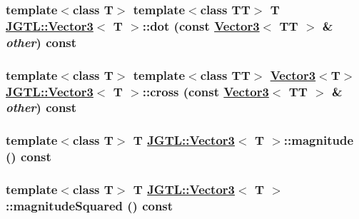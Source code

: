 \hypertarget{class_j_g_t_l_1_1_vector3_36b583fceb4142714a498d16667d9442}{
\subsubsection[dot]{\setlength{\rightskip}{0pt plus 5cm}template$<$class T$>$ template$<$class TT$>$ T \hyperlink{class_j_g_t_l_1_1_vector3}{JGTL::Vector3}$<$ T $>$::dot (const \hyperlink{class_j_g_t_l_1_1_vector3}{Vector3}$<$ TT $>$ \& {\em other}) const}}
\label{class_j_g_t_l_1_1_vector3_36b583fceb4142714a498d16667d9442}


\hypertarget{class_j_g_t_l_1_1_vector3_b2df31c04e7fb4fad13154e2c9034755}{
\subsubsection[cross]{\setlength{\rightskip}{0pt plus 5cm}template$<$class T$>$ template$<$class TT$>$ \hyperlink{class_j_g_t_l_1_1_vector3}{Vector3}$<$T$>$ \hyperlink{class_j_g_t_l_1_1_vector3}{JGTL::Vector3}$<$ T $>$::cross (const \hyperlink{class_j_g_t_l_1_1_vector3}{Vector3}$<$ TT $>$ \& {\em other}) const}}
\label{class_j_g_t_l_1_1_vector3_b2df31c04e7fb4fad13154e2c9034755}


\hypertarget{class_j_g_t_l_1_1_vector3_76b6c8216c59e895f9e1360cb0deea67}{
\subsubsection[magnitude]{\setlength{\rightskip}{0pt plus 5cm}template$<$class T$>$ T \hyperlink{class_j_g_t_l_1_1_vector3}{JGTL::Vector3}$<$ T $>$::magnitude () const}}
\label{class_j_g_t_l_1_1_vector3_76b6c8216c59e895f9e1360cb0deea67}


\hypertarget{class_j_g_t_l_1_1_vector3_642599e9f0c714fa746cf583fff34297}{
\subsubsection[magnitudeSquared]{\setlength{\rightskip}{0pt plus 5cm}template$<$class T$>$ T \hyperlink{class_j_g_t_l_1_1_vector3}{JGTL::Vector3}$<$ T $>$::magnitude\-Squared () const}}
\label{class_j_g_t_l_1_1_vector3_642599e9f0c714fa746cf583fff34297}


